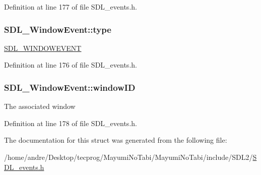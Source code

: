Definition at line 177 of file S\-D\-L\-\_\-events.\-h.

\hypertarget{struct_s_d_l___window_event_a01c8c8fbe8564e690f958d2db560f657}{
\subsubsection[{type}]{ S\-D\-L\-\_\-\-Window\-Event\-::type}}\label{struct_s_d_l___window_event_a01c8c8fbe8564e690f958d2db560f657}
\hyperlink{_s_d_l__events_8h_a3b589e89be6b35c02e0dd34a55f3fccaa5ff4e41f0d8b5def11cfe6a69ec0b698}{S\-D\-L\-\_\-\-W\-I\-N\-D\-O\-W\-E\-V\-E\-N\-T} 

Definition at line 176 of file S\-D\-L\-\_\-events.\-h.

\hypertarget{struct_s_d_l___window_event_a4b31796ffc84fbb7f6e9ba33e127619a}{
\subsubsection[{window\-I\-D}]{ S\-D\-L\-\_\-\-Window\-Event\-::window\-I\-D}}\label{struct_s_d_l___window_event_a4b31796ffc84fbb7f6e9ba33e127619a}
The associated window 

Definition at line 178 of file S\-D\-L\-\_\-events.\-h.



The documentation for this struct was generated from the following file\-:\begin{DoxyCompactItemize}
\item 
/home/andre/\-Desktop/tecprog/\-Mayumi\-No\-Tabi/\-Mayumi\-No\-Tabi/include/\-S\-D\-L2/\hyperlink{_s_d_l__events_8h}{S\-D\-L\-\_\-events.\-h}\end{DoxyCompactItemize}
